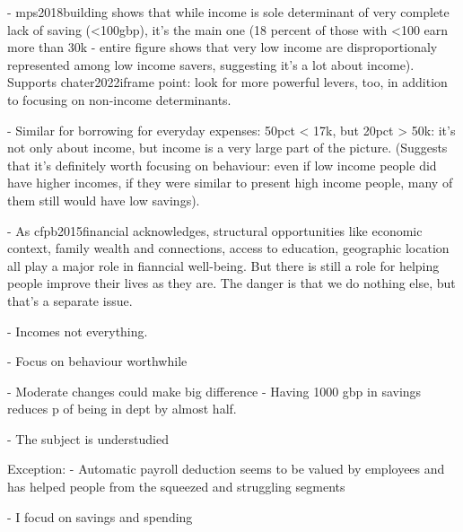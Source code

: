 - mps2018building shows that while income is sole determinant of very complete
lack of saving (<100gbp), it's the main one (18 percent of those with <100 earn
more than 30k - entire figure shows that very low income are disproportionaly
represented among low income savers, suggesting it's a lot about income).
Supports chater2022iframe point: look for more powerful levers, too, in
addition to focusing on non-income determinants.

- Similar for borrowing for everyday expenses: 50pct < 17k, but 20pct > 50k:
it's not only about income, but income is a very large part of the picture.
(Suggests that it's definitely worth focusing on behaviour: even if low income
people did have higher incomes, if they were similar to present high income
people, many of them still would have low savings).

- As cfpb2015financial acknowledges, structural opportunities like economic
context, family wealth and connections, access to education, geographic
location all play a major role in fianncial well-being. But there is still a
role for helping people improve their lives as they are. The danger is that we
do nothing else, but that's a separate issue. 

- Incomes not everything.

- Focus on behaviour worthwhile

\citet{stepchange2017strengthening}
- Moderate changes could make big difference
- Having 1000 gbp in savings reduces p of being in dept by almost half. 



- The subject is understudied

Exception:
\citet{philipps2021supporting}
- Automatic payroll deduction seems to be valued by employees and has helped
people from the squeezed and struggling segments 

- I focud on savings and spending






